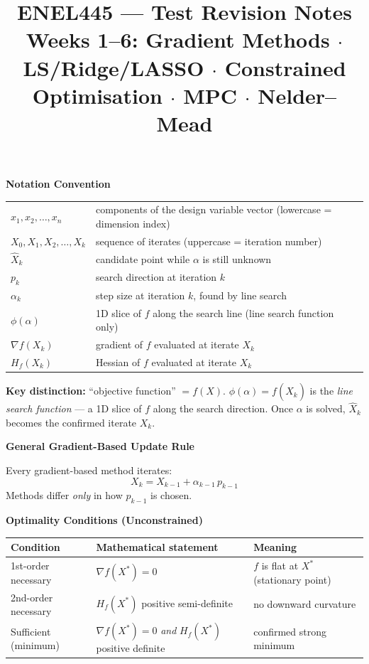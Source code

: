 \documentclass[10pt,a4paper]{article}
\title{\vspace{-12mm}\textbf{ENEL445 --- Test Revision Notes}\\
  \large Weeks 1--6: Gradient Methods $\cdot$ LS/Ridge/LASSO $\cdot$ Constrained Optimisation $\cdot$ MPC $\cdot$ Nelder--Mead}
\author{}
\date{}
\newcommand{\sectionbox}[1]{%
  \begin{mdframed}[backgroundcolor=headbg, linewidth=0pt,
    innertopmargin=4pt, innerbottommargin=4pt,
    innerleftmargin=6pt, innerrightmargin=6pt]
    \large\bfseries\color{white}#1
  \end{mdframed}\vspace{2pt}
}
\newenvironment{notebox}{%
  \begin{mdframed}[backgroundcolor=notebg, linewidth=0.6pt,
    innertopmargin=4pt, innerbottommargin=4pt,
    innerleftmargin=8pt, innerrightmargin=8pt]
}{%
  \end{mdframed}
}
\begin{document}
\maketitle
\vspace{-8mm}

\sectionbox{Notation Convention}

\begin{tabular}{@{}ll@{}}
$x_1, x_2, \ldots, x_n$ & components of the design variable vector (lowercase = dimension index) \\
$X_0, X_1, X_2, \ldots, X_k$ & sequence of iterates (uppercase = iteration number) \\
$\hat{X}_k$ & candidate point while $\alpha$ is still unknown \\
$p_k$ & search direction at iteration $k$ \\
$\alpha_k$ & step size at iteration $k$, found by line search \\
$\phi(\alpha)$ & 1D slice of $f$ along the search line (line search function only) \\
$\nabla f(X_k)$ & gradient of $f$ evaluated at iterate $X_k$ \\
$H_f(X_k)$ & Hessian of $f$ evaluated at iterate $X_k$ \\
\end{tabular}

\vspace{4pt}
\begin{notebox}
\textbf{Key distinction:} ``objective function'' $= f(X)$. \quad
$\phi(\alpha) = f(\hat{X}_k)$ is the \emph{line search function} --- a 1D slice of $f$ along the search direction.
Once $\alpha$ is solved, $\hat{X}_k$ becomes the confirmed iterate $X_k$.
\end{notebox}

\vspace{4pt}
\sectionbox{General Gradient-Based Update Rule}

Every gradient-based method iterates:
\[
  X_k = X_{k-1} + \alpha_{k-1}\, p_{k-1}
\]
Methods differ \emph{only} in how $p_{k-1}$ is chosen.

\vspace{4pt}
\sectionbox{Optimality Conditions (Unconstrained)}

\begin{tabular}{@{}lll@{}}
\toprule
Condition & Mathematical statement & Meaning \\
\midrule
1st-order necessary & $\nabla f(X^*) = 0$ & $f$ is flat at $X^*$ (stationary point) \\
2nd-order necessary & $H_f(X^*)$ positive semi-definite & no downward curvature \\
Sufficient (minimum) & $\nabla f(X^*) = 0$ \emph{and} $H_f(X^*)$ positive definite & confirmed strong minimum \\
\bottomrule
\end{tabular}
\end{document}
